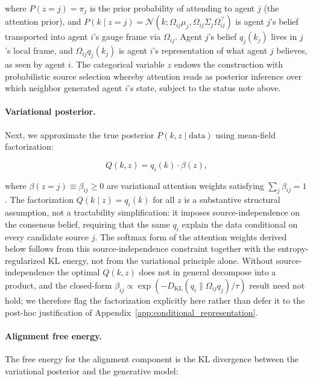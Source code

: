 \documentclass[11pt]{article}
\begin{document}
where $P(z = j) = \pi_j$ is the prior probability of attending to agent $j$ (the attention prior), and $P(k \mid z = j) = \mathcal{N}(k; \Omega_{ij}\mu_j, \Omega_{ij}\Sigma_j\Omega_{ij}^\top)$ is agent $j$'s belief transported into agent $i$'s gauge frame via $\Omega_{ij}$. Agent $j$'s belief $q_j(k_j)$ lives in $j$'s local frame, and $\Omega_{ij}q_j(k_j)$ is agent $i$'s representation of what agent $j$ believes, as seen by agent $i$. The categorical variable $z$ endows the construction with probabilistic source selection whereby attention reads as posterior inference over which neighbor generated agent $i$'s state, subject to the status note above.

\paragraph{Variational posterior.}
Next, we approximate the true posterior $P(k, z \mid \text{data})$ using mean-field factorization:

\begin{equation}
Q(k, z) = q_i(k) \cdot \beta(z),
\label{eq:mixture_posterior}
\end{equation}

where $\beta(z = j) \equiv \beta_{ij} \geq 0$ are variational attention weights satisfying $\sum_j \beta_{ij} = 1$. The factorization $Q(k \mid z) = q_i(k)$ for all $z$ is a substantive structural assumption, not a tractability simplification: it imposes source-independence on the consensus belief, requiring that the same $q_i$ explain the data conditional on every candidate source $j$. The softmax form of the attention weights derived below follows from this source-independence constraint together with the entropy-regularized KL energy, not from the variational principle alone. Without source-independence the optimal $Q(k, z)$ does not in general decompose into a product, and the closed-form $\beta_{ij} \propto \exp(-D_{\mathrm{KL}}(q_i \| \Omega_{ij}q_j)/\tau)$ result need not hold; we therefore flag the factorization explicitly here rather than defer it to the post-hoc justification of Appendix~\ref{app:conditional_representation}.

\paragraph{Alignment free energy.}
The free energy for the alignment component is the KL divergence between the variational posterior and the generative model:
\end{document}
